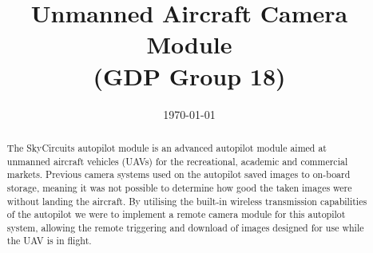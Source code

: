 \documentclass[oneside]{ecsgdp}         %
\begin{document}
\frontmatter
\title      {Unmanned Aircraft Camera Module \\(GDP Group 18)}
\date       {\today}
\subject    {ELEC6050 Group Design Project}
\maketitle
\begin{abstract}
The SkyCircuits autopilot module is an advanced autopilot module aimed at unmanned aircraft vehicles (UAVs) for the recreational, academic and commercial markets. Previous camera systems used on the autopilot saved images to on-board storage, meaning it was not possible to determine how good the taken images were without landing the aircraft. By utilising the built-in wireless transmission capabilities of the autopilot we were to implement a remote camera module for this autopilot system, allowing the remote triggering and download of images designed for use while the UAV is in flight.

\end{abstract}
\tableofcontents
\listoffigures
\listoftables
\lstlistoflistings
{}
\mainmatter



\newpage

\newpage

\newpage

\newpage

\newpage
%

\newpage

\newpage

\newpage
%

\newpage

\newpage

\newpage
\end{document}
